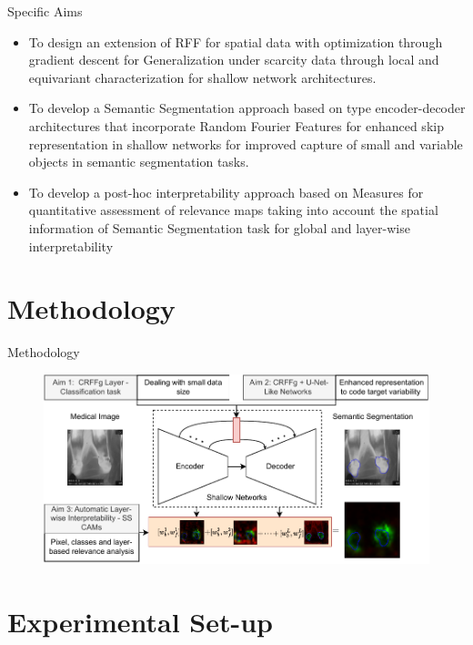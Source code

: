 \documentclass[aspectratio=169]{beamer}
\begin{document}
\begin{frame}{Specific Aims}
     \begin{itemize}

        \item To design an extension of RFF for spatial data with optimization through gradient descent for Generalization under scarcity data through local and equivariant characterization for shallow network architectures.

        \item To develop a Semantic Segmentation approach based on type encoder-decoder architectures that incorporate Random Fourier Features for enhanced skip representation in shallow networks for improved capture of small and variable objects in semantic segmentation tasks.


        \item To develop a post-hoc interpretability approach based on Measures for quantitative assessment of relevance maps taking into account the spatial information of Semantic Segmentation task for global and layer-wise interpretability

    \end{itemize}

\end{frame}


\section{Methodology}

\begin{frame}{Methodology}
    \begin{figure}
        \centering
        \includegraphics[width=0.9\linewidth]{Figures/contribution_thesis.pdf}
    \end{figure}
\end{frame}


\section{Experimental Set-up}
\end{document}
